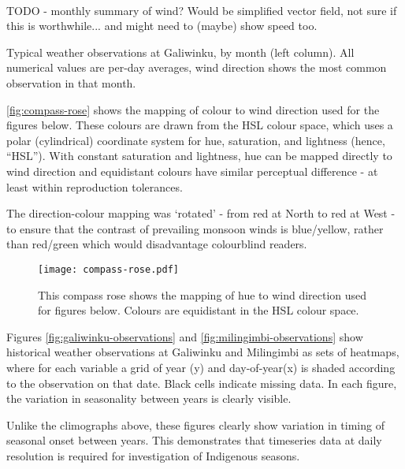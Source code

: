 ~\\

TODO - monthly summary of wind?  Would be simplified vector field, not
sure if this is worthwhile... and might need to (maybe) show speed too.

\begin{landscape}
\begin{table}
    
    \caption[Monthly weather observations at Galiwinku]{
        Typical weather observations at Galiwinku, by month (left column).
        All numerical values are per-day averages, wind direction shows the
        most common observation in that month.}
    \label{tab:galiwinku-monthly-summary}
\end{table}
\end{landscape}


\autoref{fig:compass-rose} shows the mapping of colour to wind direction used
for the figures below.  These colours are drawn from the HSL colour space,
which uses a polar (cylindrical) coordinate system for hue, saturation,
and lightness (hence, ``HSL'').  With constant saturation and lightness,
hue can be mapped directly to wind direction and equidistant colours
have similar perceptual difference - at least within reproduction tolerances.

The direction-colour mapping was `rotated' - from red at North to red at West -
to ensure that the contrast of prevailing monsoon winds is blue/yellow,
rather than red/green which would disadvantage colourblind readers.

\begin{wrapfigure}{R}{0.5\textwidth}
    \texttt{[image: compass-rose.pdf]}
    \caption[Compass Rose mapping colour to wind direction]{
        This compass rose shows the mapping of hue to wind direction used
        for figures below.  Colours are equidistant in the HSL colour space.}
    \label{fig:compass-rose}
\end{wrapfigure}



Figures \ref{fig:galiwinku-observations} and \ref{fig:milingimbi-observations}
show historical weather observations at Galiwinku and Milingimbi as
sets of heatmaps, where for each variable a grid of year (y) and day-of-year(x)
is shaded according to the observation on that date.  Black cells indicate missing data.
In each figure, the variation in seasonality between years is clearly visible.

Unlike the climographs above, these figures clearly show variation in timing
of seasonal onset between years.  This demonstrates that timeseries data
at daily resolution is required for investigation of Indigenous seasons.

